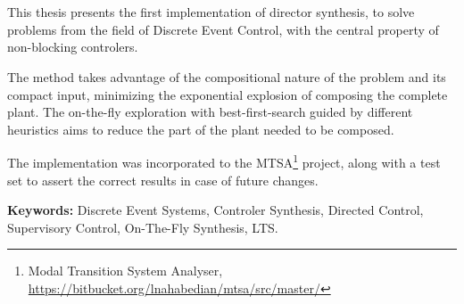 \chapter*{\runtitle}

\noindent 

This thesis presents the first implementation of director synthesis, to solve problems from the field of Discrete Event Control, with the central property of non-blocking controlers.

The method takes advantage of the compositional nature of the problem and its compact input, minimizing the exponential explosion of composing the complete plant. The on-the-fly exploration with best-first-search guided by different heuristics aims to reduce the part of the plant needed to be composed. 

The implementation was incorporated to the MTSA\footnote{Modal Transition System Analyser, \href{https://bitbucket.org/lnahabedian/mtsa/src/master/^}{https://bitbucket.org/lnahabedian/mtsa/src/master/}} project, along with a test set to assert the correct results in case of future changes.

\bigskip

\noindent\textbf{Keywords:} Discrete Event Systems, Controler Synthesis, Directed Control, Supervisory Control, On-The-Fly Synthesis, LTS.
